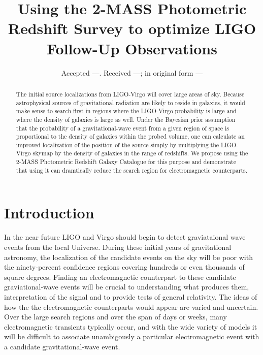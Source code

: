 \documentclass[useAMS,usenatbib]{mn2e}
\title[2MPZ and LIGO]{Using the 2-MASS Photometric Redshift Survey to optimize LIGO Follow-Up Observations}
\author[Antolini \& Heyl]{Elisa Antolini$^{1}$, Jeremy S. Heyl$\thanks{Email:
    heyl@phas.ubc.ca; Canada Research Chair}$^{2}$ \\
  $^{1}$Dipartimento di Fisica e Geologia, Universit\`a degli Studi di Perugia, I-06123 Perugia, Italia \\
  $^{2}$Department of Physics and Astronomy, University of British
  Columbia, 6224 Agricultural Road, Vancouver, BC V6T 1Z1, Canada\\
}
\begin{document}
\date{Accepted ---. Received ---; in original form ---}

\pagerange{\pageref{firstpage}--\pageref{lastpage}} 

\maketitle

\label{firstpage}

\begin{abstract}
The initial source localizations from LIGO-Virgo will cover large
areas of sky. Because astrophysical sources of gravitational radiation
are likely to reside in galaxies, it would make sense to search first
in regions where the LIGO-Virgo probability is large and where the
density of galaxies is large as well.  Under the Bayesian prior
assumption that the probability of a gravitational-wave event from a
given region of space is proportional to the density of galaxies
within the probed volume, one can calculate an improved localization
of the position of the source simply by multiplying the LIGO-Virgo
skymap by the density of galaxies in the range of redshifts.  We
propose using the 2-MASS Photometric Redshift Galaxy Catalogue for
this purpose and demonstrate that using it can dramtically reduce the
search region for electromagnetic counterparts.
\end{abstract}

\section{Introduction}

In the near future LIGO and Virgo should begin to detect graviataional
wave events from the local Universe.  During these initial years of
gravitational astronomy, the localization of the candidate events on
the sky will be poor with the ninety-percent confidence regions
covering hundreds or even thousands of square degrees.  Finding an
electromagnetic counterpart to these candidate graviational-wave
events will be crucial to understanding what produces them,
interpretation of the signal and to provide tests of general
relativity.  The ideas of how the the electromagnetic counterparts
would appear are varied and uncertain.  Over the large search regions
and over the span of days or weeks, many electromagnetic transients
typically occur, and with the wide variety of models it will be
difficult to associate unambigously a particular electromagnetic event with
a candidate gravitational-wave event.
\end{document}
